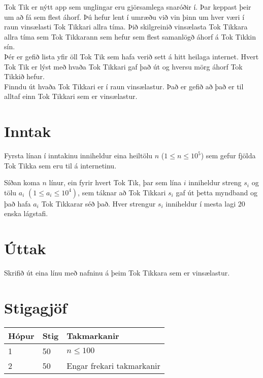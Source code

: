 
Tok Tik er nýtt app sem unglingar eru gjörsamlega snaróðir í. Þar keppast þeir
um að fá sem flest áhorf. Þú hefur lent í umræðu við vin þinn um hver væri
í raun vinsælasti Tok Tikkari allra tíma. Þið skilgreinið vinsælasta
Tok Tikkara allra tíma sem Tok Tikkarann sem hefur sem flest samanlögð áhorf
á Tok Tikkin sín. \\

Þér er gefið lista yfir öll Tok Tik sem hafa verið sett á hitt heilaga internet.
Hvert Tok Tik er lýst með hvaða Tok Tikkari gaf það út og hversu mörg áhorf Tok Tikkið hefur. \\

Finndu út hvaða Tok Tikkari er í raun vinsælastur. Það er gefið að það er til alltaf
einn Tok Tikkari sem er vinsælastur.

\section*{Inntak}
Fyrsta línan í inntakinu inniheldur eina heiltölu $n$ ($1 \leq n \leq 10^5$)
sem gefur fjölda Tok Tikka sem eru til á internetinu. 

Síðan koma $n$ línur, ein fyrir hvert Tok Tik, þar sem lína $i$ inniheldur 
streng $s_i$ og tölu $a_i$ $(1 \leq a_i \leq 10^4)$, sem táknar að Tok Tikkari $s_i$ gaf út þetta
myndband og það hafa $a_i$ Tok Tikkarar séð það. Hver strengur $s_i$ inniheldur
í mesta lagi $20$ enska lágstafi.

\section*{Úttak}
Skrifið út eina línu með nafninu á þeim Tok Tikkara sem er vinsælastur.

\section*{Stigagjöf}
\begin{tabular}{|l|l|l|}
\hline
Hópur & Stig & Takmarkanir \\ \hline
1     & 50   & $n \leq 100$ \\ \hline
2     & 50   & Engar frekari takmarkanir \\ \hline
\end{tabular}

